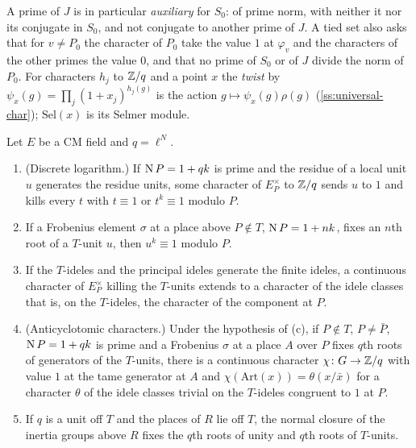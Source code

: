 A prime of $J$ is in particular \emph{auxiliary} for $S_0$: of prime norm, with neither it nor its conjugate in $S_0$, and not conjugate to another prime of $J$. A tied set also asks that for $v\ne P_0$ the character of $P_0$ take the value $1$ at $\varphi_v$ and the characters of the other primes the value $0$, and that no prime of $S_0$ or of $J$ divide the
norm of $P_0$. For characters $h_j$ to $\mathbb{Z}/q$ and a point $x$ the \emph{twist} by $\psi_x(g)=\prod_j(1+x_j)^{h_j(g)}$ is the action $g\mapsto\psi_x(g)\rho(g)$ (\cref{ss:universal-char}); $\mathrm{Sel}(x)$ is its Selmer module.

\begin{lemma}\label{lem:aux-characters}
Let $E$ be a CM field and $q=\ell^N$.
\begin{enumerate}[label=\textup{(\alph*)}]
\item (Discrete logarithm.) If $\operatorname{N} P=1+qk$ is prime and the residue of a local unit $u$ generates the residue units, some character of $E_P^\times$ to $\mathbb{Z}/q$ sends $u$ to $1$ and kills every $t$ with $t\equiv1$ or $t^k\equiv1$ modulo $P$.
\item If a Frobenius element $\sigma$ at a place above $P\notin T$, $\operatorname{N} P=1+nk$, fixes an $n$th root of a $T$-unit $u$, then $u^k\equiv1$ modulo $P$.
\item If the $T$-ideles and the principal ideles generate the finite ideles, a continuous character of $E_P^\times$ killing the $T$-units extends to a character of the idele classes that is, on the $T$-ideles, the character of the component at $P$.
\item (Anticyclotomic characters.) Under the hypothesis of (c), if $P\notin T$, $P\ne\bar P$, $\operatorname{N} P=1+qk$ is prime and a Frobenius $\sigma$ at a place $A$ over $P$ fixes $q$th roots of generators of the $T$-units, there is a continuous character $\chi\colon G\to\mathbb{Z}/q$ with value $1$ at the tame generator at $A$
and $\chi(\mathrm{Art}(x))=\theta(x/\bar x)$ for a character $\theta$ of the idele classes trivial on the $T$-ideles congruent to $1$ at $P$.
\item If $q$ is a unit off $T$ and the places of $R$ lie off $T$, the normal closure of the inertia groups above $R$ fixes the $q$th roots of unity and $q$th roots of $T$-units.
\end{enumerate}
\end{lemma}

